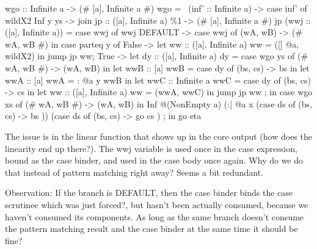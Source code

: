 \documentclass[a4paper, draft]{article}
\begin{document}
\begin{code}
\begin{code}
{{{{            wgo :: Infinite a -> (# [a], Infinite a #)
            wgo = \ (inf' :: Infinite a) -> case inf' of wildX2 {
              Inf y ys ->
                join {
                    jp :: ([a], Infinite a) \%1 -> (# [a], Infinite a #)
                    jp (wwj :: ([a], Infinite a)) =
                        case wwj of wwj {
                            DEFAULT -> case wwj of { (wA, wB) -> (# wA, wB #) } }
                    } in
                      case parteq y of {
                        False ->
                            let {
                                ww :: ([a], Infinite a)
                                ww = ([] @a, wildX2)
                            } in jump jp ww;
                        True ->
                            let {
                                dy :: ([a], Infinite a)
                                dy = case wgo ys of { (# wA, wB #) -> (wA, wB)
                                }
                            } in
                                let {
                                    wwB :: [a]
                                    wwB = case dy of { (bs, cs) -> bs }
                                } in
                                    let {
                                        wwA :: [a]
                                        wwA = : @a y wwB
                                    } in let {
                                        wwC :: Infinite a
                                        wwC = case dy of { (bs, cs) -> cs }
                                    } in let {
                                        ww :: ([a], Infinite a)
                                        ww = (wwA, wwC)
                                    } in jump jp ww
                                }
              };
          } in
              case wgo xs of { (# wA, wB #) -> (wA, wB) }
      } in
          Inf @(NonEmpty a) (:| @a x (case ds of { (bs, cs) -> bs })) (case ds of { (bs, cs) -> go cs })
    };
  } in go eta
\end{code}
The issue is in the linear function that shows up in the core output (how does
the linearity end up there?). The wwj variable is used once in the case
expression, bound as the case binder, and used in the case body once again. Why
do we do that instead of pattern matching right away? Seems a bit redundant.

Observation: If the branch is DEFAULT, then the case binder binds the case
scrutinee which was just forced?, but hasn't been actually consumed, because we
haven't consumed its components. As long as the same branch doesn't consume the
pattern matching result and the case binder at the same time it should be fine?


\end{code}
\end{document}
